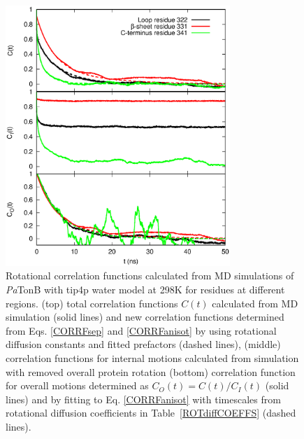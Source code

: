 \documentclass[pre,aps,floatfix,authordate1-4,twocolumn]{revtex4-1}
\begin{document}
\begin{figure}[!h]
  \includegraphics[width=8.5cm]{../Figs/exampleCORRF2.eps}%
  \caption{Rotational correlation functions calculated from MD simulations of {\it Pa}TonB with tip4p water
    model at 298K for residues at different regions.
    (top) total correlation functions $C(t)$ calculated from MD simulation (solid lines) and
    new correlation functions determined from Eqs. \ref{CORRFsep} and \ref{CORRFanisot} by
    using rotational diffusion constants and fitted prefactors (dashed lines),
    (middle) correlation functions for internal motions calculated from simulation with removed overall protein rotation
    (bottom) correlation function for overall motions determined as $C_O(t)=C(t)/C_I(t)$ (solid lines) and by fitting
    to Eq. \ref{CORRFanisot} with timescales from rotational diffusion coefficients in Table~\ref{ROTdiffCOEFFS} (dashed lines).
    }\label{exampleCORRF}
\end{figure}
\end{document}
